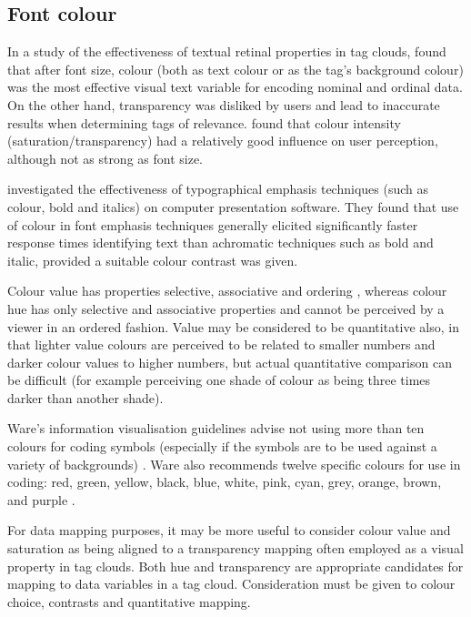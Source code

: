 \subsection{Font colour}\label{sect:fontcolour}

In a study of the effectiveness of textual retinal properties in tag clouds, \citet{waldner13} found that after font size, colour (both as text colour or as the tag's background colour) was the most effective visual text variable for encoding nominal and ordinal data. On the other hand, transparency was disliked by users and lead to inaccurate results when determining tags of relevance. \citet{bateman08} found that colour intensity (saturation/transparency) had a relatively good influence on user perception, although not as strong as font size. 

\citet{preston10} investigated the effectiveness of typographical emphasis techniques (such as colour, bold and italics) on computer presentation software. They found that use of colour in font emphasis techniques generally elicited significantly faster response times identifying  text than achromatic techniques such as bold and italic, provided a suitable colour contrast was given.

Colour value has properties selective, associative and ordering \citep{bertin83}, whereas colour hue has only selective and associative properties and cannot be perceived by a viewer in an ordered fashion. Value may be considered to be quantitative also, in that lighter value colours are perceived to be related to smaller numbers and darker colour values to higher numbers, but actual quantitative comparison can be difficult (for example perceiving one shade of colour as being three times darker than another shade). 

Ware's information visualisation guidelines advise not using more than ten colours for coding symbols (especially if the symbols are to be used against a variety of backgrounds) \citep[pg 124, chap 4, G4.15][]{ware04}. Ware also recommends twelve specific colours for use in coding: red, green, yellow, black, blue, white, pink, cyan, grey, orange, brown, and purple \citep[pg 126, chap 4, G4.18][]{ware04}.

For data mapping purposes, it may be more useful to consider colour value and saturation as being aligned to a transparency mapping often employed as a visual property in tag clouds. Both hue and transparency are appropriate candidates for mapping to data variables in a tag cloud. Consideration must be given to colour choice, contrasts and quantitative mapping.


